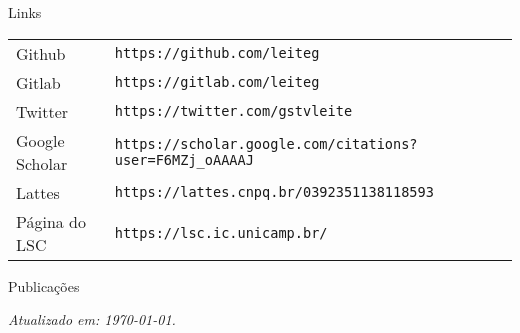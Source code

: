 \documentclass[a4paper]{resume}
\begin{document}
\newpage

\begin{rSection}{Links}
  \begin{tabular}{ll}
    Github         & {\tt https://github.com/leiteg} \\
    Gitlab         & {\tt https://gitlab.com/leiteg} \\
    Twitter        & {\tt https://twitter.com/gstvleite} \\
    Google Scholar & {\tt https://scholar.google.com/citations?user=F6MZj\_oAAAAJ} \\
    Lattes         & {\tt https://lattes.cnpq.br/0392351138118593} \\
    Página do LSC  & {\tt https://lsc.ic.unicamp.br/}
  \end{tabular}
\end{rSection}

\begin{rSection}{Publicações}

\renewcommand{\section}[2]{}

\end{rSection}

\vfill \hfill {\em Atualizado em: \today.}
\end{document}
